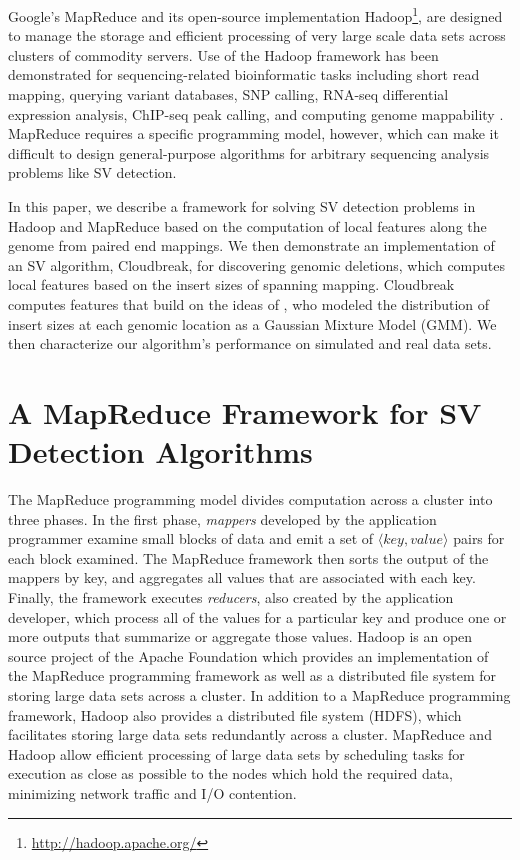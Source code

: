 \documentclass[11pt]{article}
\begin{document}
Google's MapReduce \autocite{Dean:2008p277} and its open-source implementation Hadoop\footnote{\url{http://hadoop.apache.org/}}, are designed to manage the storage and efficient processing of very large scale data sets across clusters of commodity servers. Use of the Hadoop framework has been demonstrated for sequencing-related bioinformatic tasks including short read mapping, \autocite{Schatz:2009p278} querying variant databases, \autocite{Oconnor:2010p1835} SNP calling, \autocite{Langmead:2009p1225} RNA-seq differential expression analysis, \autocite{Langmead:2010p1268} ChIP-seq peak calling, \autocite{Feng:2011p1228} and computing genome mappability \autocite{Lee:2012bk}. MapReduce requires a specific programming model, however, which can make it difficult to design general-purpose algorithms for arbitrary sequencing analysis problems like SV detection.

In this paper, we describe a framework for solving SV detection problems in Hadoop and MapReduce based on the computation of local features along the genome from paired end mappings. We then demonstrate an implementation of an SV algorithm, Cloudbreak, for discovering genomic deletions, which computes local features based on the insert sizes of spanning mapping. Cloudbreak computes features that build on the ideas of \autocite{Lee:2009da}, who modeled the distribution of insert sizes at each genomic location as a Gaussian Mixture Model (GMM). We then characterize our algorithm's performance on simulated and real data sets.

\section{A MapReduce Framework for SV Detection Algorithms}

The MapReduce programming model \autocite{Dean:2008p277} divides computation across a cluster into three phases. In the first phase, \emph{mappers} developed by the application programmer examine small blocks of data and emit a set of $\langle key, value \rangle$ pairs for each block examined. The MapReduce framework then sorts the output of the mappers by key, and aggregates all values that are associated with each key. Finally, the framework executes \emph{reducers}, also created by the application developer, which process all of the values for a particular key and produce one or more outputs that summarize or aggregate those values. Hadoop is an open source project of the Apache Foundation which provides an implementation of the MapReduce programming framework as well as a distributed file system for storing large data sets across a cluster. In addition to a MapReduce programming framework, Hadoop also provides a distributed file system (HDFS), which facilitates storing large data sets redundantly across a cluster. MapReduce and Hadoop allow efficient processing of large data sets by scheduling tasks for execution as close as possible to the nodes which hold the required data, minimizing network traffic and I/O contention.
\end{document}
